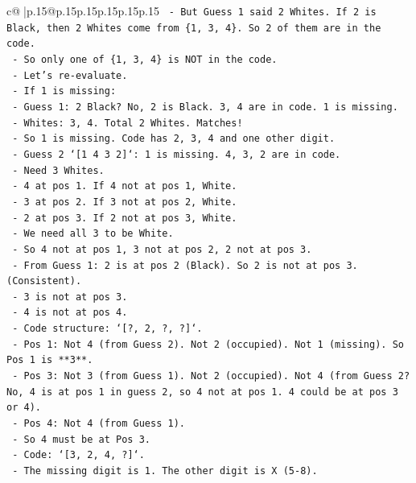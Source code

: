 \documentclass{article}
\begin{document}
{\begin{supertabular}{c@{$\;$}|p{.15\linewidth}@{}p{.15\linewidth}p{.15\linewidth}p{.15\linewidth}p{.15\linewidth}p{.15\linewidth}}
{{{\texttt{      {-} But Guess 1 said 2 Whites. If 2 is Black, then 2 Whites come from \{1, 3, 4\}. So 2 of them are in the code.} \\
\texttt{      {-} So only one of \{1, 3, 4\} is NOT in the code.} \\
\texttt{      {-} Let's re{-}evaluate.} \\
\texttt{      {-} If 1 is missing:} \\
\texttt{        {-} Guess 1: 2 Black? No, 2 is Black. 3, 4 are in code. 1 is missing.} \\
\texttt{        {-} Whites: 3, 4. Total 2 Whites. Matches!} \\
\texttt{        {-} So 1 is missing. Code has 2, 3, 4 and one other digit.} \\
\texttt{        {-} Guess 2 `{[}1 4 3 2{]}`: 1 is missing. 4, 3, 2 are in code.} \\
\texttt{        {-} Need 3 Whites.} \\
\texttt{        {-} 4 at pos 1. If 4 not at pos 1, White.} \\
\texttt{        {-} 3 at pos 2. If 3 not at pos 2, White.} \\
\texttt{        {-} 2 at pos 3. If 2 not at pos 3, White.} \\
\texttt{        {-} We need all 3 to be White.} \\
\texttt{        {-} So 4 not at pos 1, 3 not at pos 2, 2 not at pos 3.} \\
\texttt{        {-} From Guess 1: 2 is at pos 2 (Black). So 2 is not at pos 3. (Consistent).} \\
\texttt{        {-} 3 is not at pos 3.} \\
\texttt{        {-} 4 is not at pos 4.} \\
\texttt{        {-} Code structure: `{[}?, 2, ?, ?{]}`.} \\
\texttt{        {-} Pos 1: Not 4 (from Guess 2). Not 2 (occupied). Not 1 (missing). So Pos 1 is **3**.} \\
\texttt{        {-} Pos 3: Not 3 (from Guess 1). Not 2 (occupied). Not 4 (from Guess 2? No, 4 is at pos 1 in guess 2, so 4 not at pos 1. 4 could be at pos 3 or 4).} \\
\texttt{        {-} Pos 4: Not 4 (from Guess 1).} \\
\texttt{        {-} So 4 must be at Pos 3.} \\
\texttt{        {-} Code: `{[}3, 2, 4, ?{]}`.} \\
\texttt{        {-} The missing digit is 1. The other digit is X (5{-}8).} \\
}}}
\end{supertabular}}
\end{document}
